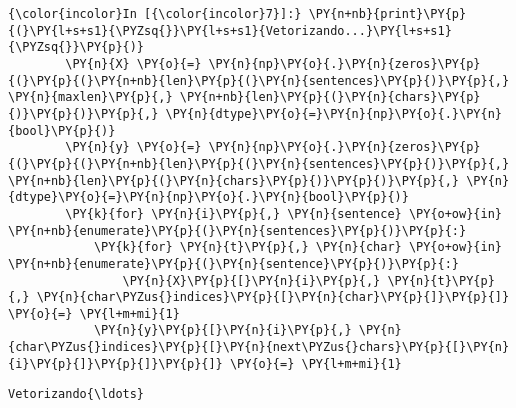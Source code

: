     \begin{Verbatim}[commandchars=\\\{\}]
{\color{incolor}In [{\color{incolor}7}]:} \PY{n+nb}{print}\PY{p}{(}\PY{l+s+s1}{\PYZsq{}}\PY{l+s+s1}{Vetorizando...}\PY{l+s+s1}{\PYZsq{}}\PY{p}{)}
        \PY{n}{X} \PY{o}{=} \PY{n}{np}\PY{o}{.}\PY{n}{zeros}\PY{p}{(}\PY{p}{(}\PY{n+nb}{len}\PY{p}{(}\PY{n}{sentences}\PY{p}{)}\PY{p}{,} \PY{n}{maxlen}\PY{p}{,} \PY{n+nb}{len}\PY{p}{(}\PY{n}{chars}\PY{p}{)}\PY{p}{)}\PY{p}{,} \PY{n}{dtype}\PY{o}{=}\PY{n}{np}\PY{o}{.}\PY{n}{bool}\PY{p}{)}
        \PY{n}{y} \PY{o}{=} \PY{n}{np}\PY{o}{.}\PY{n}{zeros}\PY{p}{(}\PY{p}{(}\PY{n+nb}{len}\PY{p}{(}\PY{n}{sentences}\PY{p}{)}\PY{p}{,} \PY{n+nb}{len}\PY{p}{(}\PY{n}{chars}\PY{p}{)}\PY{p}{)}\PY{p}{,} \PY{n}{dtype}\PY{o}{=}\PY{n}{np}\PY{o}{.}\PY{n}{bool}\PY{p}{)}
        \PY{k}{for} \PY{n}{i}\PY{p}{,} \PY{n}{sentence} \PY{o+ow}{in} \PY{n+nb}{enumerate}\PY{p}{(}\PY{n}{sentences}\PY{p}{)}\PY{p}{:}
            \PY{k}{for} \PY{n}{t}\PY{p}{,} \PY{n}{char} \PY{o+ow}{in} \PY{n+nb}{enumerate}\PY{p}{(}\PY{n}{sentence}\PY{p}{)}\PY{p}{:}
                \PY{n}{X}\PY{p}{[}\PY{n}{i}\PY{p}{,} \PY{n}{t}\PY{p}{,} \PY{n}{char\PYZus{}indices}\PY{p}{[}\PY{n}{char}\PY{p}{]}\PY{p}{]} \PY{o}{=} \PY{l+m+mi}{1}
            \PY{n}{y}\PY{p}{[}\PY{n}{i}\PY{p}{,} \PY{n}{char\PYZus{}indices}\PY{p}{[}\PY{n}{next\PYZus{}chars}\PY{p}{[}\PY{n}{i}\PY{p}{]}\PY{p}{]}\PY{p}{]} \PY{o}{=} \PY{l+m+mi}{1}
\end{Verbatim}

    \begin{Verbatim}[commandchars=\\\{\}]
Vetorizando{\ldots}

    \end{Verbatim}

